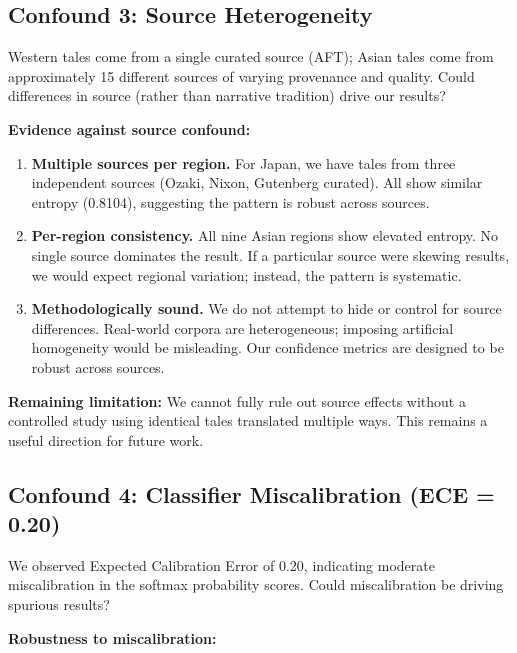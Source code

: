 \documentclass{article}
\begin{document}
\subsection{Confound 3: Source Heterogeneity}

Western tales come from a single curated source (AFT); Asian tales come from approximately 15 different sources of varying provenance and quality. Could differences in source (rather than narrative tradition) drive our results?

\textbf{Evidence against source confound:}
\begin{enumerate}
\item \textbf{Multiple sources per region.} For Japan, we have tales from three independent sources (Ozaki, Nixon, Gutenberg curated). All show similar entropy (0.8104), suggesting the pattern is robust across sources.

\item \textbf{Per-region consistency.} All nine Asian regions show elevated entropy. No single source dominates the result. If a particular source were skewing results, we would expect regional variation; instead, the pattern is systematic.

\item \textbf{Methodologically sound.} We do not attempt to hide or control for source differences. Real-world corpora are heterogeneous; imposing artificial homogeneity would be misleading. Our confidence metrics are designed to be robust across sources.
\end{enumerate}

\textbf{Remaining limitation:} We cannot fully rule out source effects without a controlled study using identical tales translated multiple ways. This remains a useful direction for future work.

\subsection{Confound 4: Classifier Miscalibration (ECE = 0.20)}

We observed Expected Calibration Error of 0.20, indicating moderate miscalibration in the softmax probability scores. Could miscalibration be driving spurious results?

\textbf{Robustness to miscalibration:}
\end{document}
